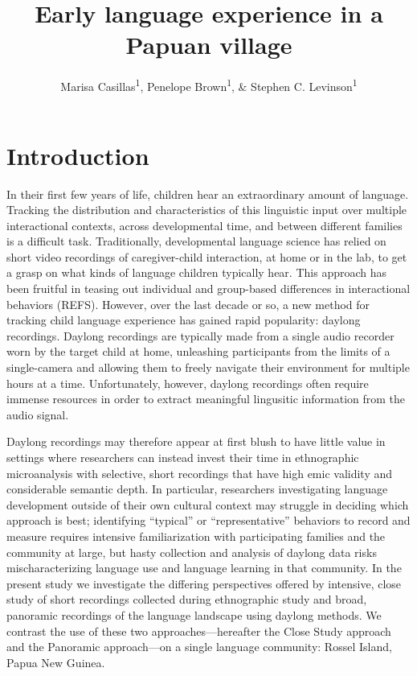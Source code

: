 \documentclass[,man,floatsintext]{apa6}
\title{Early language experience in a Papuan village}
\author{Marisa Casillas\textsuperscript{1}, Penelope Brown\textsuperscript{1},
\& Stephen C. Levinson\textsuperscript{1}}
\date{}
\affiliation{
\vspace{0.5cm}
\textsuperscript{1} Max Planck Institute for Psycholinguistics}
\begin{document}
\maketitle

\section{Introduction}\label{intro}

In their first few years of life, children hear an extraordinary amount
of language. Tracking the distribution and characteristics of this
linguistic input over multiple interactional contexts, across
developmental time, and between different families is a difficult task.
Traditionally, developmental language science has relied on short video
recordings of caregiver-child interaction, at home or in the lab, to get
a grasp on what kinds of language children typically hear. This approach
has been fruitful in teasing out individual and group-based differences
in interactional behaviors (REFS). However, over the last decade or so,
a new method for tracking child language experience has gained rapid
popularity: daylong recordings. Daylong recordings are typically made
from a single audio recorder worn by the target child at home,
unleashing participants from the limits of a single-camera and allowing
them to freely navigate their environment for multiple hours at a time.
Unfortunately, however, daylong recordings often require immense
resources in order to extract meaningful lingusitic information from the
audio signal.

Daylong recordings may therefore appear at first blush to have little
value in settings where researchers can instead invest their time in
ethnographic microanalysis with selective, short recordings that have
high emic validity and considerable semantic depth. In particular,
researchers investigating language development outside of their own
cultural context may struggle in deciding which approach is best;
identifying \enquote{typical} or \enquote{representative} behaviors to
record and measure requires intensive familiarization with participating
families and the community at large, but hasty collection and analysis
of daylong data risks mischaracterizing language use and language
learning in that community. In the present study we investigate the
differing perspectives offered by intensive, close study of short
recordings collected during ethnographic study and broad, panoramic
recordings of the language landscape using daylong methods. We contrast
the use of these two approaches---hereafter the Close Study approach and
the Panoramic approach---on a single language community: Rossel Island,
Papua New Guinea.
\end{document}
